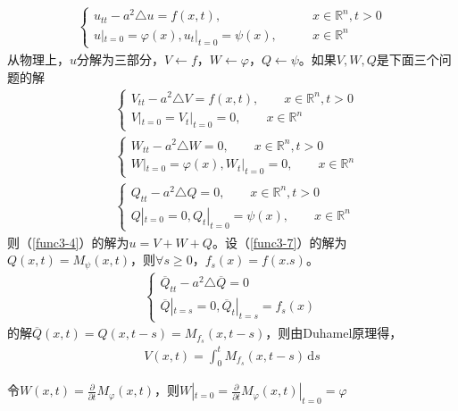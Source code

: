 \documentclass[11pt, a4paper]{article}
\theoremstyle{theorem}
\newcommand{\intd}[1]{\,\mathrm{d}{#1}}
\begin{document}
\begin{align}
\label{func3-4}
    \begin{cases}
    u_{tt} - a^2 \triangle u = f(x,t), \quad \quad &x \in \mathbb{R}^n, t > 0 \\
    u|_{t = 0} = \varphi(x), u_t|_{t = 0} = \psi(x), \quad \quad &x \in \mathbb{R}^n
    \end{cases}
\end{align}
从物理上，$u$分解为三部分，$V \leftarrow f$，$W \leftarrow \varphi$，$Q \leftarrow \psi$。如果$V,W,Q$是下面三个问题的解
\begin{align}
\label{func3-5}
    &\begin{cases}
    V_{tt} - a^2 \triangle V = f(x,t), \quad \quad x \in \mathbb{R}^n, t > 0 \\
    V|_{t = 0} = V_t|_{t = 0} = 0, \quad \quad x \in \mathbb{R}^n
    \end{cases} \\
    \label{func3-6}
    &\begin{cases}
    W_{tt} - a^2 \triangle W = 0, \quad \quad x \in \mathbb{R}^n, t > 0 \\
    W|_{t = 0} = \varphi(x), W_t|_{t = 0} = 0, \quad \quad x \in \mathbb{R}^n
    \end{cases}\\
    \label{func3-7}
    &\begin{cases}
    Q_{tt} - a^2 \triangle Q = 0, \quad \quad x \in \mathbb{R}^n, t > 0 \\
    Q|_{t = 0} = 0, Q_t|_{t = 0} = \psi(x),  \quad \quad x \in \mathbb{R}^n
    \end{cases}
\end{align}
则（\ref{func3-4}）的解为$u = V+W+Q$。设（\ref{func3-7}）的解为$Q(x,t) = M_\psi(x,t)$，则$\forall s \geq 0$，$f_s(x) = f(x.s)$。
\begin{align*}
    \begin{cases}
    \overline{Q}_{tt} - a^2 \triangle \overline{Q} = 0 \\
    \overline{Q}|_{t = s} = 0, \overline{Q}_t |_{t = s} = f_s(x)
    \end{cases}
\end{align*}
的解$\overline{Q}(x,t) = Q(x,t-s) = M_{f_s}(x,t - s)$，则由Duhamel原理得，
\begin{align*}
    V(x,t) = \int_0^t M_{f_s}(x,t-s) \intd s
\end{align*}

令$W(x,t) = \frac{\partial}{\partial t} M_\varphi(x,t)$，则$W|_{t = 0} = \frac{\partial}{\partial t} M_\varphi(x,t) |_{t = 0} = \varphi$
\end{document}
